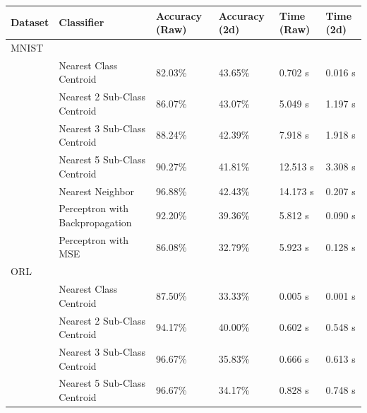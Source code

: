 \begin{table}[!htbp]
    \centering
    \begin{tabular}{|l|l|l|l|l|l|} 
    \hline
    Dataset & Classifier                      & Accuracy (Raw)       & Accuracy (2d)        & Time (Raw)           & Time (2d)  \\ 
    \hline
    MNIST   & \multicolumn{1}{l}{}            & \multicolumn{1}{l}{} & \multicolumn{1}{l}{} & \multicolumn{1}{l}{} &            \\ 
    \hline
            & Nearest Class Centroid          & 82.03\%              & 43.65\%              & 0.702 s              & 0.016 s    \\ 
    \cline{2-6}
            & Nearest 2 Sub-Class Centroid    & 86.07\%              & 43.07\%              & 5.049 s              & 1.197 s    \\ 
    \cline{2-6}
            & Nearest 3 Sub-Class Centroid    & 88.24\%              & 42.39\%              & 7.918 s              & 1.918 s    \\ 
    \cline{2-6}
            & Nearest 5 Sub-Class Centroid    & 90.27\%              & 41.81\%              & 12.513 s             & 3.308 s    \\ 
    \cline{2-6}
            & Nearest Neighbor                & 96.88\%              & 42.43\%              & 14.173 s             & 0.207 s    \\ 
    \cline{2-6}
            & Perceptron with Backpropagation & 92.20\%              & 39.36\%              & 5.812 s              & 0.090 s    \\ 
    \cline{2-6}
            & Perceptron with MSE             & 86.08\%              & 32.79\%              & 5.923 s              & 0.128 s    \\ 
    \hline
    ORL     & \multicolumn{1}{l}{}            & \multicolumn{1}{l}{} & \multicolumn{1}{l}{} & \multicolumn{1}{l}{} &            \\ 
    \hline
            & Nearest Class Centroid          & 87.50\%              & 33.33\%              & 0.005 s              & 0.001 s    \\ 
    \cline{2-6}
            & Nearest 2 Sub-Class Centroid    & 94.17\%              & 40.00\%              & 0.602 s              & 0.548 s    \\ 
    \cline{2-6}
            & Nearest 3 Sub-Class Centroid    & 96.67\%              & 35.83\%              & 0.666 s              & 0.613 s    \\ 
    \cline{2-6}
            & Nearest 5 Sub-Class Centroid    & 96.67\%              & 34.17\%              & 0.828 s              & 0.748 s    \\ 

\end{tabular}
\end{table}
